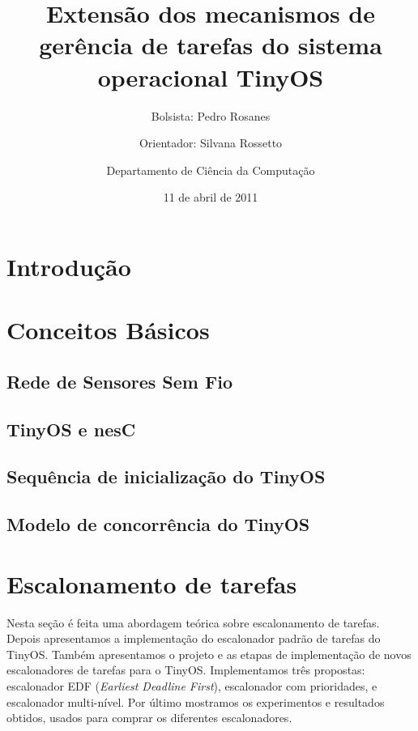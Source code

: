 \documentclass[a4paper, 10pt]{article}
\title{Extensão dos mecanismos de gerência de tarefas do sistema operacional TinyOS}
\author{Bolsista: Pedro Rosanes \and Orientador: Silvana Rossetto \and Departamento de Ciência da Computação}
\date{11 de abril de 2011}
\begin{document}
\begin{titlepage}
\maketitle
\tableofcontents
\end{titlepage}



\section{Introdução}\label{intro}


\section{Conceitos Básicos}\label{teoria}

\subsection{Rede de Sensores Sem Fio}


\subsection{TinyOS e nesC}


\subsection {Sequência de inicialização do TinyOS}\label{inicializacao}


\subsection{Modelo de concorrência do TinyOS}\label{modeloconcorrencia}



\section{Escalonamento de tarefas}\label{escalonadorespropostos}
Nesta seção é feita uma abordagem teórica sobre escalonamento de tarefas.
Depois apresentamos a implementação do escalonador padrão de tarefas do TinyOS.
Também apresentamos o projeto e as etapas de implementação de novos escalonadores de tarefas para o TinyOS.
Implementamos três propostas: escalonador EDF (\textit{Earliest Deadline First}), escalonador com prioridades,  
e escalonador multi-nível.
Por último mostramos os experimentos e resultados obtidos, usados para comprar os diferentes escalonadores.
\end{document}
